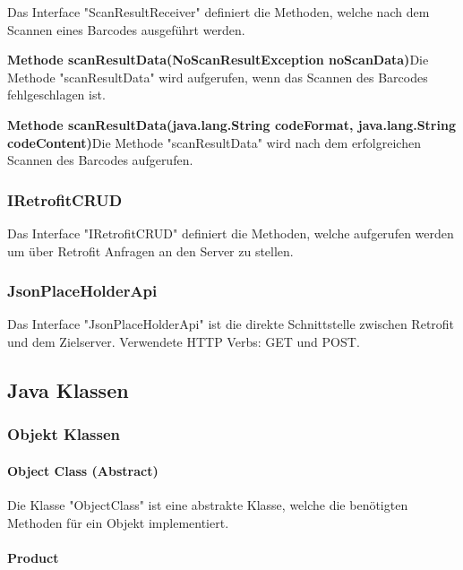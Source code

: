 \documentclass{scrartcl}
\begin{document}
Das Interface "ScanResultReceiver" definiert die Methoden, welche nach dem Scannen eines Barcodes ausgeführt werden. \newline

\noindent\textbf{Methode scanResultData(NoScanResultException noScanData)}\newline Die Methode "scanResultData" wird aufgerufen, wenn das Scannen des Barcodes fehlgeschlagen ist.\newline

\noindent\textbf{Methode scanResultData(java.lang.String codeFormat, java.lang.String codeContent)}\newline Die Methode "scanResultData" wird nach dem erfolgreichen Scannen des Barcodes aufgerufen.

\subsubsection{IRetrofitCRUD}

Das Interface "IRetrofitCRUD" definiert die Methoden, welche aufgerufen werden um über Retrofit Anfragen an den Server zu stellen.

\subsubsection{JsonPlaceHolderApi}

Das Interface "JsonPlaceHolderApi" ist die direkte Schnittstelle zwischen Retrofit und dem Zielserver. Verwendete HTTP Verbs: GET und POST.

\subsection{Java Klassen}

\subsubsection{Objekt Klassen}

\paragraph{Object Class (Abstract)}

Die Klasse "ObjectClass" ist eine abstrakte Klasse, welche die benötigten Methoden für ein Objekt implementiert.

\paragraph{Product}
\end{document}
